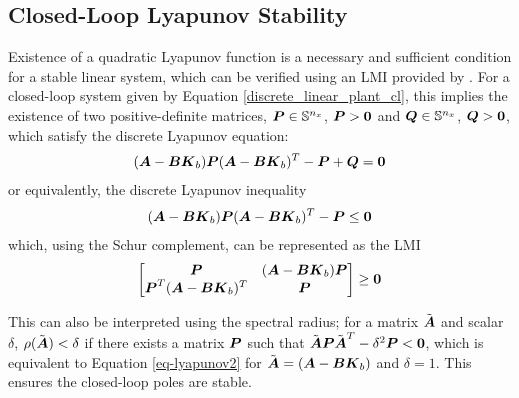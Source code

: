 \subsection{Closed-Loop Lyapunov Stability}
Existence of a quadratic Lyapunov function is a necessary and sufficient condition for a stable linear system, which can be verified using an LMI provided by \cite{bernstein2009matrix,caverly2019lmi}.  For a closed-loop system given by Equation \eqref{discrete_linear_plant_cl}, this implies the existence of two positive-definite matrices, $\vb*{P} \in \mathbb{S}^{n_{x}}$, $\vb*{P} > \vb*{0}$ and $\vb*{Q} \in \mathbb{S}^{n_{x}}$, $\vb*{Q} > \vb*{0}$, which satisfy the discrete Lyapunov equation:
\begin{equation}
\label{eq-lyapunov}
\begin{aligned}
	(\vb*{A} - \vb*{B}\vb*{K}_{b}) \vb*{P} (\vb*{A} - \vb*{B}\vb*{K}_{b})^{T} - \vb*{P} + \vb*{Q} = \vb*{0}
\end{aligned}
\end{equation}
or equivalently, the discrete Lyapunov inequality
\begin{equation}
\label{eq-lyapunov2}
\begin{aligned}
	(\vb*{A} - \vb*{B}\vb*{K}_{b}) \vb*{P} (\vb*{A} - \vb*{B}\vb*{K}_{b})^{T} - \vb*{P} \leq \vb*{0}
\end{aligned}
\end{equation}
which, using the Schur complement, can be represented as the LMI
\begin{equation}
\label{eq-lyapunov-lmi}
\begin{aligned}
	\begin{bmatrix}
		\vb*{P} & (\vb*{A} - \vb*{B}\vb*{K}_{b})\vb*{P}\\
		\vb*{P}^{T}(\vb*{A} - \vb*{B}\vb*{K}_{b})^{T} & \vb*{P}\\
	\end{bmatrix} \geq \vb*{0}
\end{aligned}
\end{equation}

This can also be interpreted using the spectral radius; for a matrix $\tilde{\vb*{A}}$ and scalar $\delta$, $\rho(\tilde{\vb*{A}}) < \delta$ if there exists a matrix $\vb*{P}$ such that $\tilde{\vb*{A}}\vb*{P}\tilde{\vb*{A}}^{T} - \delta^{2}\vb*{P} < \vb*{0}$, which is equivalent to Equation \eqref{eq-lyapunov2} for $\tilde{\vb*{A}} = (\vb*{A} - \vb*{B}\vb*{K}_{b})$ and $\delta = 1$.  This ensures the closed-loop poles are stable.

